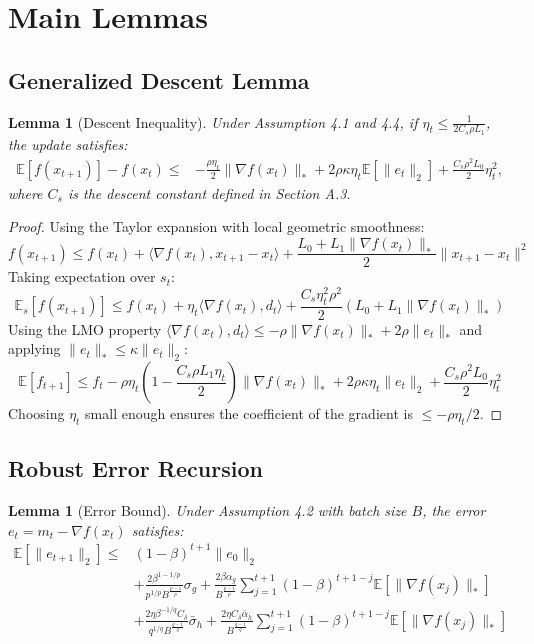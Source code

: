 \documentclass{article}
\theoremstyle{plain}
\newtheorem{lemma}[theorem]{Lemma}
\theoremstyle{definition}
\theoremstyle{remark}
\begin{document}
\section{Main Lemmas}

\subsection{Generalized Descent Lemma}
\begin{lemma}[Descent Inequality]
\label{lemma:descent}
Under Assumption 4.1 and 4.4, if $\eta_t \le \frac{1}{2 C_s \rho L_1}$, the update satisfies:
\begin{align}
    \mathbb{E}[f(x_{t+1})] - f(x_t) \le &-\frac{\rho \eta_t}{2} \|\nabla f(x_t)\|_* + 2\rho \kappa \eta_t \mathbb{E}[\|e_t\|_2] + \frac{C_s \rho^2 L_0}{2} \eta_t^2,
\end{align}
where $C_s$ is the descent constant defined in Section A.3.
\end{lemma}
\begin{proof}
Using the Taylor expansion with local geometric smoothness:
$$ f(x_{t+1}) \le f(x_t) + \langle \nabla f(x_t), x_{t+1} - x_t \rangle + \frac{L_0 + L_1 \|\nabla f(x_t)\|_* }{2} \|x_{t+1} - x_t\|^2 $$
Taking expectation over $s_t$:
$$ \mathbb{E}_{s}[f(x_{t+1})] \le f(x_t) + \eta_t \langle \nabla f(x_t), d_t \rangle + \frac{C_s \eta_t^2 \rho^2}{2} (L_0 + L_1 \|\nabla f(x_t)\|_* ) $$
Using the LMO property $\langle \nabla f(x_t), d_t \rangle \le -\rho \|\nabla f(x_t)\|_* + 2\rho \|e_t\|_*$ and applying $\|e_t\|_* \le \kappa \|e_t\|_2$:
$$ \mathbb{E}[f_{t+1}] \le f_t - \rho \eta_t \left( 1 - \frac{C_s \rho L_1 \eta_t}{2} \right) \|\nabla f(x_t)\|_* + 2\rho \kappa \eta_t \|e_t\|_2 + \frac{C_s \rho^2 L_0}{2} \eta_t^2 $$
Choosing $\eta_t$ small enough ensures the coefficient of the gradient is $\le -\rho \eta_t / 2$.
\end{proof}

\subsection{Robust Error Recursion}
\begin{lemma}[Error Bound]
\label{lemma:error}
Under Assumption 4.2 with batch size $B$, the error $e_t = m_t - \nabla f(x_t)$ satisfies:
\begin{align}
    \mathbb{E}[\|e_{t+1}\|_2] \le &(1-\beta)^{t+1} \|e_0\|_2 \nonumber \\
    &+ \frac{2 \beta^{1 - 1/p}}{p^{1/p} B^{\frac{p-1}{p}}} \sigma_g + \frac{2 \beta \alpha_g}{B^{\frac{p-1}{p}}} \sum_{j=1}^{t+1} (1-\beta)^{t+1-j} \mathbb{E}[\|\nabla f(x_j)\|_*] \nonumber \\
    &+ \frac{2 \eta \beta^{-1/q} C_\delta}{q^{1/q} B^{\frac{q-1}{q}}} \bar{\sigma}_h + \frac{2 \eta C_\delta \bar{\alpha}_h}{B^{\frac{q-1}{q}}} \sum_{j=1}^{t+1} (1-\beta)^{t+1-j} \mathbb{E}[\|\nabla f(x_j)\|_*]
\end{align}
\end{lemma}
\end{document}
